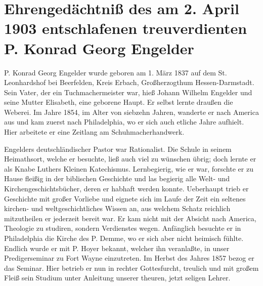 \chapter[Ehrengedächtniß des P. Konrad Georg Engelder]{Ehrengedächtniß des am 2. April 1903 entschlafenen treuverdienten P. Konrad Georg Engelder}

P. Konrad Georg Engelder wurde geboren am 1. März 1837 auf dem St. Leonhardshof bei Beerfelden, Kreis Erbach, Großherzogthum Hessen-Darmstadt. Sein Vater, der ein Tuchmachermeister war, hieß Johann Wilhelm Engelder und seine Mutter Elisabeth, eine geborene Haupt. Er selbst lernte draußen die Weberei. Im Jahre 1854, im Alter von siebzehn Jahren, wanderte er nach America aus und kam zuerst nach Philadelphia, wo er sich auch etliche Jahre aufhielt. Hier arbeitete er eine Zeitlang am Schuhmacherhandwerk.

Engelders deutschländischer Pastor war Rationalist. Die Schule in seinem Heimathsort, welche er besuchte, ließ auch viel zu wünschen übrig; doch lernte er als Knabe Luthers Kleinen Katechismus. Lernbegierig, wie er war, forschte er zu Hause fleißig in der biblischen Geschichte und las begierig alle Welt- und Kirchengeschichtsbücher, deren er habhaft werden konnte. Ueberhaupt trieb er Geschichte mit großer Vorliebe und eignete sich im Laufe der Zeit ein seltenes kirchen- und weltgeschichtliches Wissen an, aus welchem Schatz reichlich mitzutheilen er jederzeit bereit war. Er kam nicht mit der Absicht nach America, Theologie zu studiren, sondern Verdienstes wegen. Anfänglich besuchte er in Philadelphia die Kirche des P. Demme, wo er sich aber nicht heimisch fühlte. Endlich wurde er mit P. Hoyer bekannt, welcher ihn veranlaßte, in unser Predigerseminar zu Fort Wayne einzutreten. Im Herbst des Jahres 1857 bezog er das Seminar. Hier betrieb er nun in rechter Gottesfurcht, treulich und mit großem Fleiß sein Studium unter Anleitung unserer theuren, jetzt seligen Lehrer.

